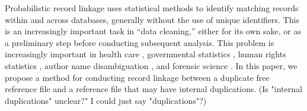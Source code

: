 \documentclass[12pt,letterpaper]{article}
\newcommand{\1}[1]{\mathbb{I}\!\left[#1\right]} %
\def \brian#1{{\color{red} (#1)}}
\begin{document}


Probabilistic record linkage uses statistical methods to identify matching records within and across databases, generally without the use of unique identifiers. This is an increasingly important task in ``data cleaning,'' either for its own sake, or as a preliminary step before conducting subsequent analysis. This problem is increasingly important in health care \citep{gutman_bayesian_2013, hof2017probabilistic}, governmental statistics \citep{Jaro1995, Fortinietal01}, human rights statistics \citep{lum2013applications, price2015documents, Sadosky2015, sadinle_detecting_2014, sadinle_bayesian_2018}, author name disambiguation \citep{lai_2011, zhang2018name}, and forensic science \citep{Tai2019}. In this paper, we propose a method for conducting record linkage between a duplicate free reference file and a reference file that may have internal duplications. \brian{Is "internal duplications" unclear?" I could just say "duplications"?}
\end{document}
